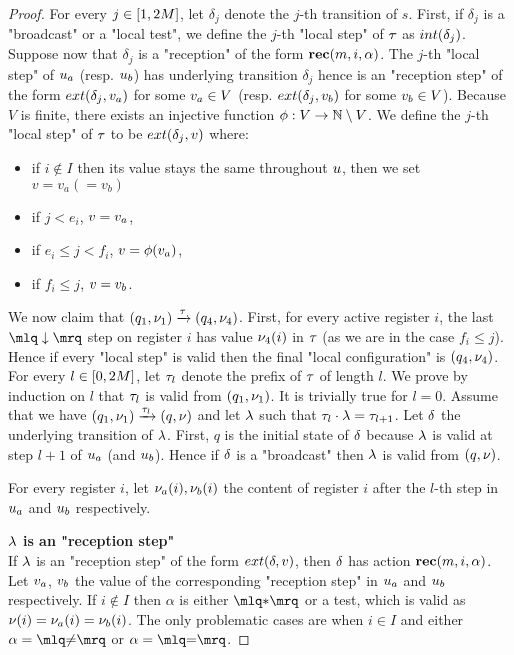 \begin{proof}
	For every $j \in [1,2M]$, let $\delta_j$ denote the $j$-th transition of $s$. First, if  $\delta_j$ is a "broadcast" or a "local test", we define the $j$-th "local step" of $\tau$ as $\intlabel{\delta_j}$. 
	Suppose now that $\delta_j$ is a "reception" of the form $\textbf{rec}(m, i, \alpha)$. The $j$-th "local step" of $u_a$ (resp. $u_b$) has underlying transition $\delta_j$ hence is an "reception step" of the form $\extlabel{\delta_j}{\aval_a}$ for some $v_a \in V$ (resp. $\extlabel{\delta_j}{\aval_b}$ for some $v_b \in V$).
	Because $V$ is finite, there exists an injective function $\phi: V \rightarrow \mathbb{N} \setminus V$.
	We define the $j$-th "local step" of $\tau$ to be $\extlabel{\delta_j}{\aval}$ where:
	\begin{itemize}
		\item if $i \notin I$ then its value stays the same throughout $u$, then we set $v = v_a (= v_b)$ 
		\item if $j < e_i$, $v = v_a$,
		\item if $e_i \leq j < f_i$, $v = \phi(v_a)$,
		\item if $f_i \leq j$, $v = v_b$.
	\end{itemize}
	We now claim that $(q_1,\nu_1) \xrightarrow{\tau} (q_4,\nu_4)$. 
	First, for every active register $i$, the last $\quotemarks{\enregact}$ step on register $i$ has value $\nu_4(i)$ in $\tau$ (as we are in the case $f_i \leq j$). Hence if every "local step" is valid then the final "local configuration" is $(q_4, \nu_4)$.
	For every $l \in [0,2M]$, let $\tau_l$ denote the prefix of $\tau$ of length $l$.
	We prove by induction on $l$ that $\tau_l$ is valid from $(q_1, \nu_1)$. It is trivially true for $l =0$. Assume that we have $(q_1, \nu_1) \xrightarrow{\tau_l} (q, \nu)$ and let $\lambda$ such that $\tau_l \cdot \lambda = \tau_{l+1}$. Let $\delta$ the underlying transition of $\lambda$.
	First, $q$ is the initial state of $\delta$ because $\lambda$ is valid at step $l+1$ of $u_a$ (and $u_b$). Hence if $\delta$ is a "broadcast" then $\lambda$ is valid from $(q,\nu)$.
	
	For every register $i$, let $\nu_a(i), \nu_b(i)$ the content of register $i$ after the $l$-th step in $u_a$ and $u_b$ respectively.
	
	\noindent \textbf{$\lambda$ is an "reception step"} \\
	If $\lambda$ is an "reception step" of the form $\extlabel{\atrans}{\aval}$, then $\delta$ has action $\textbf{rec}(m, i, \alpha)$. Let $v_a$, $v_b$ the value of the corresponding "reception step" in $u_a$ and $u_b$ respectively. If $i \notin I$ then $\alpha$ is either $\quotemarks{\dummyact}$ or a test, which is valid as   $\nu(i) = \nu_a(i) = \nu_b(i)$.
	The only problematic cases are when $i \in I$ and either $\anact = \quotemarks{\diseqtestact}$ or $\anact = \quotemarks{\eqtestact}$. 
	

\end{proof}
